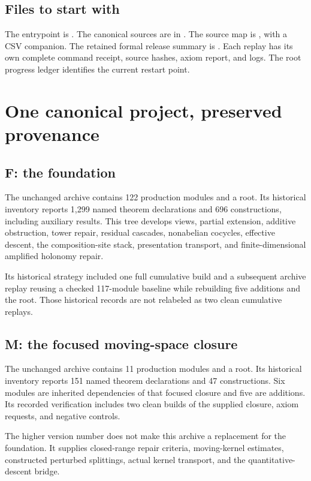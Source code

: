 \documentclass[11pt]{article}
\begin{document}
\subsection*{Files to start with}
The entrypoint is . The canonical sources are in . The source map is , with a CSV companion. The retained formal release summary is . Each replay has its own complete command receipt, source hashes, axiom report, and logs. The root progress ledger identifies the current restart point.

\clearpage\section{One canonical project, preserved provenance}
\subsection{F: the foundation}
The unchanged archive  contains 122 production modules and a root. Its historical inventory reports 1,299 named theorem declarations and 696 constructions, including auxiliary results. This tree develops views, partial extension, additive obstruction, tower repair, residual cascades, nonabelian cocycles, effective descent, the composition-site stack, presentation transport, and finite-dimensional amplified holonomy repair.

Its historical strategy included one full cumulative build and a subsequent archive replay reusing a checked 117-module baseline while rebuilding five additions and the root. Those historical records are not relabeled as two clean cumulative replays.

\subsection{M: the focused moving-space closure}
The unchanged archive  contains 11 production modules and a root. Its historical inventory reports 151 named theorem declarations and 47 constructions. Six modules are inherited dependencies of that focused closure and five are additions. Its recorded verification includes two clean builds of the supplied closure, axiom requests, and negative controls.

The higher version number does not make this archive a replacement for the foundation. It supplies closed-range repair criteria, moving-kernel estimates, constructed perturbed splittings, actual kernel transport, and the quantitative-descent bridge.
\end{document}
